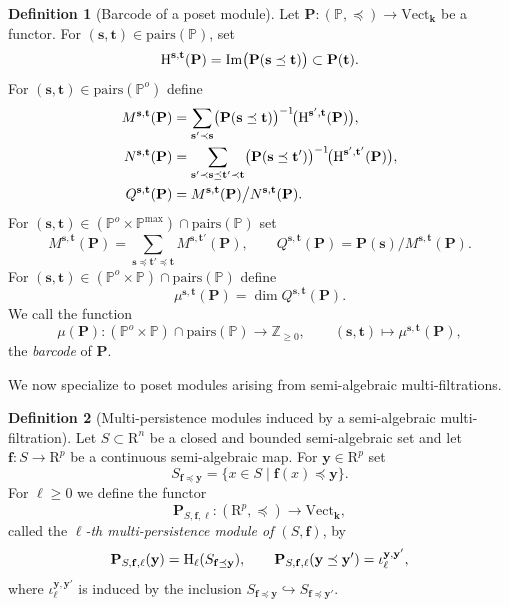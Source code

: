 \documentclass{amsart}[10pts]
\theoremstyle{definition}
\newtheorem{definition}{Definition}[section]
\theoremstyle{remark}
\theoremstyle{observation}
\numberwithin{equation}{section}
\newcommand {\R} {\mathrm{R}}
\newcommand {\Z}  {\mathbb{Z}}
\newcommand {\kk}         {\mathbf{k}}
\newcommand {\PP}     {\mathbb{P}} %
\newcommand{\HH}  {\mbox{\rm H}}
\newcommand{\Pairs}{\mathrm{pairs}}
\newcommand{\Vect}{\mathrm{Vect}}
\begin{document}
\begin{definition}[Barcode of a poset module]
\label{def:persistent}
Let $\mathbf P:(\PP,\preceq)\to \Vect_{\kk}$ be a functor.
For $(\mathbf s,\mathbf t)\in \Pairs(\PP)$, set
\[
\HH^{\mathbf s,\mathbf t}(\mathbf P)=\mathrm{Im}\bigl(\mathbf P(\mathbf s\preceq \mathbf t)\bigr)\subset \mathbf P(\mathbf t).
\]
For $(\mathbf s,\mathbf t)\in \Pairs(\PP^{o})$ define
\begin{align*}
M^{\mathbf s,\mathbf t}(\mathbf P)
&=\sum_{\mathbf s'\prec \mathbf s}\bigl(\mathbf P(\mathbf s\preceq \mathbf t)\bigr)^{-1}\!\bigl(\HH^{\mathbf s',\mathbf t}(\mathbf P)\bigr),\\
N^{\mathbf s,\mathbf t}(\mathbf P)
&=\sum_{\mathbf s'\prec \mathbf s\preceq \mathbf t'\prec \mathbf t}\bigl(\mathbf P(\mathbf s\preceq \mathbf t')\bigr)^{-1}\!\bigl(\HH^{\mathbf s',\mathbf t'}(\mathbf P)\bigr),\\
Q^{\mathbf s,\mathbf t}(\mathbf P)
&=M^{\mathbf s,\mathbf t}(\mathbf P)\big/ N^{\mathbf s,\mathbf t}(\mathbf P).
\end{align*}
For $(\mathbf s,\mathbf t)\in (\PP^{o}\times \PP^{\max})\cap \Pairs(\PP)$ set
\[
M^{\mathbf s,\mathbf t}(\mathbf P)=\sum_{\mathbf s\preceq \mathbf t'\preceq \mathbf t} M^{\mathbf s,\mathbf t'}(\mathbf P),
\qquad
Q^{\mathbf s,\mathbf t}(\mathbf P)=\mathbf P(\mathbf s)\big/ M^{\mathbf s,\mathbf t}(\mathbf P).
\]
For $(\mathbf s,\mathbf t)\in (\PP^{o}\times \PP)\cap \Pairs(\PP)$ define
\begin{equation}
\label{eqn:def:barcode:multiplicity}
\mu^{\mathbf s,\mathbf t}(\mathbf P)=\dim Q^{\mathbf s,\mathbf t}(\mathbf P).
\end{equation}
We call the function
\[
\mu(\mathbf P):(\PP^{o}\times \PP)\cap \Pairs(\PP)\to \Z_{\ge 0},
\qquad
(\mathbf s,\mathbf t)\mapsto \mu^{\mathbf s,\mathbf t}(\mathbf P),
\]
the \emph{barcode} of $\mathbf P$.
\end{definition}

\medskip
We now specialize to poset modules arising from semi-algebraic multi-filtrations.

\begin{definition}[Multi-persistence modules induced by a semi-algebraic multi-filtration]
\label{def:semi-algebraic-mp-poset-module}
Let $S\subset \R^n$ be a closed and bounded semi-algebraic set and let $\mathbf f:S\to \R^p$ be a continuous semi-algebraic map.
For $\mathbf y\in \R^p$ set
\[
S_{\mathbf f\preceq \mathbf y}=\{x\in S \mid \mathbf f(x)\preceq \mathbf y\}.
\]
For $\ell\ge 0$ we define the functor
\[
\mathbf P_{S,\mathbf f,\ell}:(\R^p,\preceq)\to \Vect_{\kk},
\]
called the \emph{$\ell$-th multi-persistence module of $(S,\mathbf f)$}, by
\[
\mathbf P_{S,\mathbf f,\ell}(\mathbf y)=\HH_\ell(S_{\mathbf f\preceq \mathbf y}),
\qquad
\mathbf P_{S,\mathbf f,\ell}(\mathbf y\preceq \mathbf y')=\iota^{\mathbf y,\mathbf y'}_\ell,
\]
where $\iota^{\mathbf y,\mathbf y'}_\ell$ is induced by the inclusion
$S_{\mathbf f\preceq \mathbf y}\hookrightarrow S_{\mathbf f\preceq \mathbf y'}$.
\end{definition}
\end{document}
